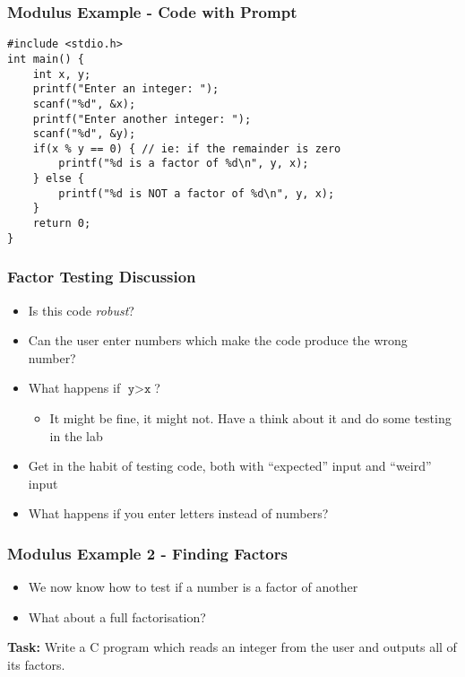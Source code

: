 \documentclass[14pt]{beamer}
\begin{document}
\begin{frame}[fragile]
\frametitle{Modulus Example - Code with Prompt}
\begin{lstlisting}[style=CStyle,caption=\texttt{factorTest.c}]
#include <stdio.h>
int main() {
	int x, y;
	printf("Enter an integer: ");
	scanf("%d", &x);
	printf("Enter another integer: ");
	scanf("%d", &y);
	if(x % y == 0) { // ie: if the remainder is zero
		printf("%d is a factor of %d\n", y, x);
	} else {
		printf("%d is NOT a factor of %d\n", y, x);
	}
	return 0;
}
\end{lstlisting}
\end{frame}

\begin{frame}
\frametitle{Factor Testing Discussion}
\begin{itemize}
\item Is this code \textit{robust}?
\item Can the user enter numbers which make the code produce the wrong number?
\item What happens if $\texttt{y}>\texttt{x}$?
	\begin{itemize}
		\item It might be fine, it might not. Have a think about it and do some testing in the lab
	\end{itemize}
\item Get in the habit of testing code, both with ``expected'' input and ``weird'' input
\item What happens if you enter letters instead of numbers?
\end{itemize}
\end{frame}

\begin{frame}
\frametitle{Modulus Example 2 - Finding Factors}
\begin{itemize}
\item We now know how to test if a number is a factor of another
\item What about a full factorisation?
\end{itemize}

\textbf{Task:} Write a C program which reads an integer from the user and outputs all of its factors.
\end{frame}
\end{document}
